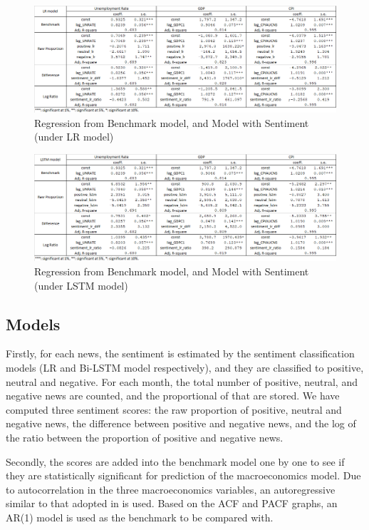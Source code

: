 \documentclass[11pt,a4paper]{article}
\begin{document}
\begin{figure}
\centering
\includegraphics[width=150mm]{images/table_lr.png}
\caption{Regression from Benchmark model, and Model with Sentiment (under LR model)}
\label{fig_lr}
\end{figure}

\begin{figure}
\centering
\includegraphics[width=150mm]{images/table_lstm.png}
\caption{Regression from Benchmark model, and Model with Sentiment (under LSTM model)}
\label{fig_lstm}
\end{figure}

\subsection{Models}

Firstly, for each news, the sentiment is estimated by the sentiment classification models (LR and Bi-LSTM model respectively), and they are classified to positive, neutral and negative. For each month, the total number of positive, neutral, and negative news are counted, and the proportional of that are stored. We have computed three sentiment scores: the raw proportion of positive, neutral and negative news, the difference between positive and negative news, and the log of the ratio between the proportion of positive and negative news.

Secondly, the scores are added into the benchmark model one by one to see if they are statistically significant for prediction of the macroeconomics model. Due to autocorrelation in the three macroeconomics variables, an autoregressive similar to that adopted in \cite{P6} is used. Based on the ACF and PACF graphs, an AR(1) model is used as the benchmark to be compared with.
\end{document}
